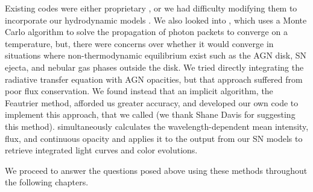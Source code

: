 Existing codes were either proprietary \citep[,][]{Jack+09,HauschildtBaron10}, or we had difficulty modifying them to incorporate our hydrodynamic models \citep[,][]{Kasen+06}.
We also looked into  \citep{Dullemond+12-RADMC-3D}, which uses a Monte Carlo algorithm to solve the propagation of photon packets to converge on a temperature, but, there were concerns over whether it would converge in situations where non-thermodynamic equilibrium exist such as the AGN disk, SN ejecta, and nebular gas phases outside the disk.
We tried directly integrating the radiative transfer equation with AGN opacities, but that approach suffered from poor flux conservation.
We found instead that an implicit algorithm, the Feautrier method, afforded us greater accuracy, and developed our own code to implement this approach, that we called \ocotillo (we thank Shane Davis for suggesting this method).
\ocotillo simultaneously calculates the wavelength-dependent mean intensity, flux, and continuous opacity and applies it to the output from our SN models to retrieve integrated light curves and color evolutions.




We proceed to answer the questions posed above using these methods throughout the following chapters.

